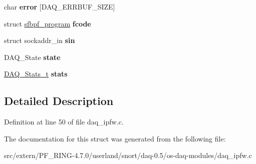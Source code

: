 \begin{DoxyCompactItemize}
\item 
\hypertarget{struct_ipfw_impl_ac0fc4bb42e7eb445c08fa298177b419e}{
char {\bfseries error} \mbox{[}DAQ\_\-ERRBUF\_\-SIZE\mbox{]}}
\label{struct_ipfw_impl_ac0fc4bb42e7eb445c08fa298177b419e}

\item 
\hypertarget{struct_ipfw_impl_ad1cbbd7e2b6a1ec9bb841dced18cec15}{
struct \hyperlink{structsfbpf__program}{sfbpf\_\-program} {\bfseries fcode}}
\label{struct_ipfw_impl_ad1cbbd7e2b6a1ec9bb841dced18cec15}

\item 
\hypertarget{struct_ipfw_impl_a7606133ffc7e2440e7abfec5bf4f55ea}{
struct sockaddr\_\-in {\bfseries sin}}
\label{struct_ipfw_impl_a7606133ffc7e2440e7abfec5bf4f55ea}

\item 
\hypertarget{struct_ipfw_impl_aec75e88698abee19aed01b6eb243b1ff}{
DAQ\_\-State {\bfseries state}}
\label{struct_ipfw_impl_aec75e88698abee19aed01b6eb243b1ff}

\item 
\hypertarget{struct_ipfw_impl_a60843a31c1dbbe8ca908002bbaacea1d}{
\hyperlink{struct__daq__stats}{DAQ\_\-Stats\_\-t} {\bfseries stats}}
\label{struct_ipfw_impl_a60843a31c1dbbe8ca908002bbaacea1d}

\end{DoxyCompactItemize}


\subsection{Detailed Description}


Definition at line 50 of file daq\_\-ipfw.c.



The documentation for this struct was generated from the following file:\begin{DoxyCompactItemize}
\item 
src/extern/PF\_\-RING-\/4.7.0/userland/snort/daq-\/0.5/os-\/daq-\/modules/daq\_\-ipfw.c\end{DoxyCompactItemize}
